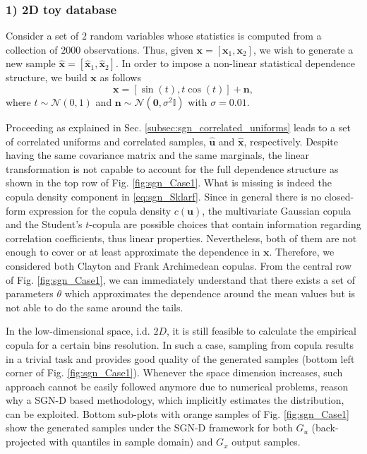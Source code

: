 \subsubsection{1) 2D toy database}
Consider a set of $2$ random variables whose statistics is computed from a collection of $2000$ observations. Thus, given $\mathbf{x} = [\mathbf{x}_1, \mathbf{x}_2]$, we wish to generate a new sample $\mathbf{\hat{x}} = [\mathbf{\hat{x}}_1, \mathbf{\hat{x}}_2]$. In order to impose a non-linear statistical dependence structure, we build $\mathbf{x}$ as follows
\begin{equation}
\label{eq:sgn_toy2D}
\mathbf{x} = [\sin(t), t\cos(t)] + \mathbf{n},
\end{equation}
where $t\sim \mathcal{N}(0,1)$ and $\mathbf{n}\sim \mathcal{N}(\mathbf{0},\sigma^2 \mathbb{I})$ with $\sigma = 0.01$. 

Proceeding as explained in Sec. \ref{subsec:sgn_correlated_uniforms} leads to a set of correlated uniforms and correlated samples, $\mathbf{\hat{u}}$ and $ \mathbf{\hat{x}}$, respectively. Despite having the same covariance matrix and the same marginals, the linear transformation is not capable to account for the full dependence structure as shown in the top row of Fig. \ref{fig:sgn_Case1}.
What is missing is indeed the copula density component in \eqref{eq:sgn_Sklarf}. Since in general there is no closed-form expression for the copula density  $c(\mathbf{u})$, the multivariate Gaussian copula and the Student's $t$-copula are possible choices that contain information regarding correlation coefficients, thus linear properties. Nevertheless, both of them are not enough to cover or at least approximate the dependence in $\mathbf{x}$.
Therefore, we considered both Clayton \cite{ClaytonCop} and Frank Archimedean copulas. From the central row of Fig. \ref{fig:sgn_Case1}, we can immediately understand that there exists a set of parameters $\theta$ which approximates the dependence around the mean values but is not able to do the same around the tails.

In the low-dimensional space, i.d. $2D$, it is still feasible to calculate the empirical copula for a certain bins resolution. In such a case, sampling from copula results in a trivial task and provides good quality of the generated samples (bottom left corner of Fig. \ref{fig:sgn_Case1}). Whenever the space dimension increases, such approach cannot be easily followed anymore due to numerical problems, reason why a SGN-D based methodology, which implicitly estimates the distribution, can be exploited.
Bottom sub-plots with orange samples of Fig. \ref{fig:sgn_Case1} show the generated samples under the SGN-D framework for both $G_u$ (back-projected with quantiles in sample domain) and $G_x$ output samples. 

